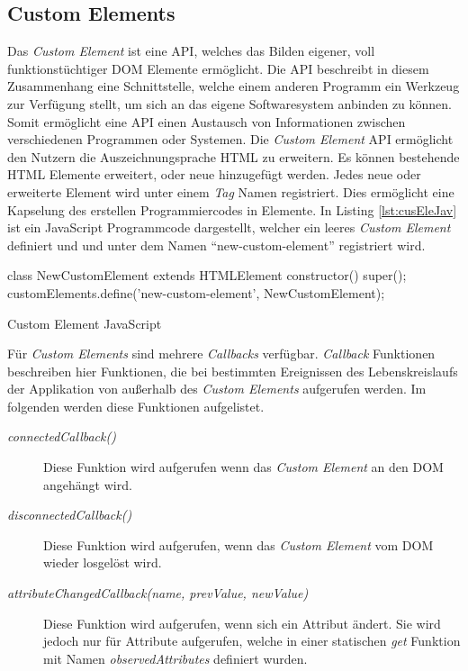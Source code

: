 \documentclass[12pt, paper=a4, bibtotoc, toc=listof, headsepline=true]{scrreprt}
\begin{document}
		\subsection{Custom Elements}
		Das \emph{Custom Element} ist eine \ac{API}, welches das Bilden eigener, voll funktionstüchtiger \ac{DOM} Elemente ermöglicht.\cite[vgl.]{Denicola2016} Die \ac{API} beschreibt in diesem Zusammenhang eine Schnittstelle, welche einem anderen Programm ein Werkzeug zur Verfügung stellt, um sich an das eigene Softwaresystem anbinden zu können.\cite[vgl.]{Behrendt2016} Somit ermöglicht eine \ac{API} einen Austausch von Informationen zwischen verschiedenen Programmen oder Systemen.	
		Die \emph{Custom Element} \ac{API} ermöglicht den Nutzern die Auszeichnungsprache \ac{HTML} zu erweitern.\cite[vgl.]{Argelius2016} Es können bestehende \ac{HTML} Elemente erweitert, oder neue hinzugefügt werden. Jedes neue oder erweiterte Element wird unter einem \emph{Tag} Namen registriert. Dies ermöglicht eine Kapselung des erstellen Programmiercodes in Elemente. In Listing \ref{lst:cusEleJav} ist ein JavaScript Programmcode dargestellt, welcher ein leeres \emph{Custom Element} definiert und und unter dem Namen \enquote{new-custom-element} registriert wird.
		\begin{listing}
			\begin{JavaScriptcode*}{}
class NewCustomElement extends HTMLElement {
	constructor() {
		super();
	}
}
customElements.define('new-custom-element', NewCustomElement);
			\end{JavaScriptcode*}
			\caption{Custom Element JavaScript}
			\label{lst:cusEleJav}
		\end{listing}
		Für \emph{Custom Elements} sind mehrere \emph{Callbacks} verfügbar. \emph{Callback} Funktionen beschreiben hier Funktionen, die bei bestimmten Ereignissen des Lebenskreislaufs der Applikation von außerhalb des \emph{Custom Elements} aufgerufen werden. Im folgenden werden diese Funktionen aufgelistet.\cite[vgl.]{Argelius2016}
		\begin{description}  
			\item  [\emph{connectedCallback()}] Diese Funktion wird aufgerufen wenn das \emph{Custom Element} an den \ac{DOM} angehängt wird.
			
			\item [\emph{disconnectedCallback()}] Diese Funktion wird aufgerufen, wenn das \emph{Custom Element} vom \ac{DOM} wieder losgelöst wird. 
			
			\item  [\emph{attributeChangedCallback(name, prevValue, newValue)}] Diese Funktion wird aufgerufen, wenn sich ein Attribut ändert. Sie wird jedoch nur für Attribute aufgerufen, welche in einer statischen \emph{get} Funktion mit Namen \emph{observedAttributes} definiert wurden.
		\end{description}
\end{document}
